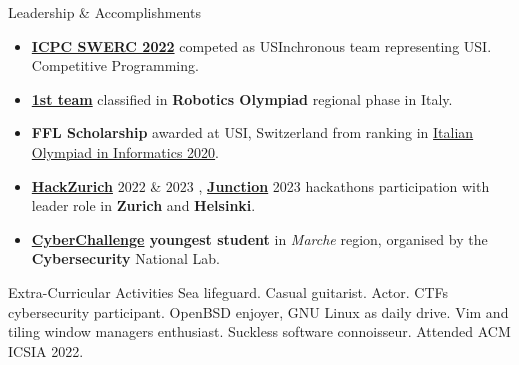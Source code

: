 \documentclass{resume} %
\begin{document}
\begin{rSection}{Leadership \& Accomplishments}
    \begin{itemize}
        \item \textbf{\href{https://swerc.eu/2022/teams/}{ICPC SWERC 2022}}
              competed as USInchronous team representing USI. Competitive Programming.

        \item \textbf{\href{https://www.makerslab.it/olimpiadi-robotiche-ancona-2019/}{1st team}}
              classified in \textbf{Robotics Olympiad} regional phase in Italy.

        \item \textbf{FFL Scholarship} awarded at USI, Switzerland from ranking in
              \href{https://www.olimpiadi-informatica.it/index.php/selezione-territoriale-20.html}{Italian Olympiad in Informatics 2020}.

        \item \textbf{\href{https://hackzurich.com/}{HackZurich}} $2022$ \& $2023$ , \href{https://www.junction2023.com/}{\textbf{Junction}} 2023
              hackathons participation with leader role in \textbf{Zurich} and \textbf{Helsinki}.

        \item \textbf{\href{https://cyberchallenge.it/}{CyberChallenge} youngest student}
              in \textit{Marche} region, organised by the \textbf{Cybersecurity} National Lab.
    \end{itemize}
\end{rSection}

\begin{rSection}{Extra-Curricular Activities}
    Sea lifeguard.
    Casual guitarist.
    Actor.
    CTFs cybersecurity participant.
    OpenBSD enjoyer, GNU \text{+} Linux as daily drive.
    Vim and tiling window managers enthusiast.
    Suckless software connoisseur.
    Attended ACM ICSIA 2022.
\end{rSection}
\end{document}
